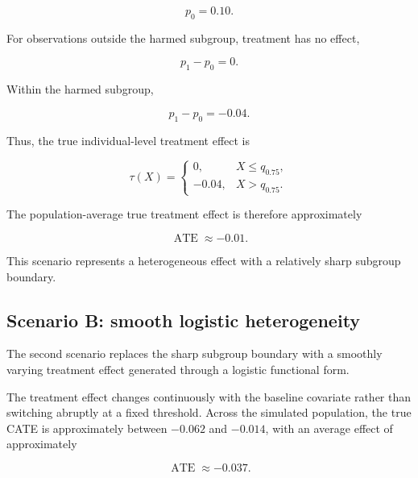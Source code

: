 \documentclass[11pt,a4paper]{article}
\newcommand{\ATE}{\operatorname{ATE}}
\begin{document}
\begin{equation}
p_0=0.10.
\end{equation}

For observations outside the harmed subgroup, treatment has no effect,

\begin{equation}
p_1-p_0=0.
\end{equation}

Within the harmed subgroup,

\begin{equation}
p_1-p_0=-0.04.
\end{equation}

Thus, the true individual-level treatment effect is

\begin{equation}
\tau(X)
=
\begin{cases}
0,
&
X\leq q_{0.75},
\\[4pt]
-0.04,
&
X>q_{0.75}.
\end{cases}
\end{equation}

The population-average true treatment effect is therefore approximately

\begin{equation}
\ATE\approx -0.01.
\end{equation}

This scenario represents a heterogeneous effect with a relatively sharp
subgroup boundary.


\subsection{Scenario B: smooth logistic heterogeneity}

The second scenario replaces the sharp subgroup boundary with a smoothly
varying treatment effect generated through a logistic functional form.

The treatment effect changes continuously with the baseline covariate rather
than switching abruptly at a fixed threshold. Across the simulated
population, the true CATE is approximately between $-0.062$ and $-0.014$,
with an average effect of approximately

\begin{equation}
\ATE\approx -0.037.
\end{equation}
\end{document}
